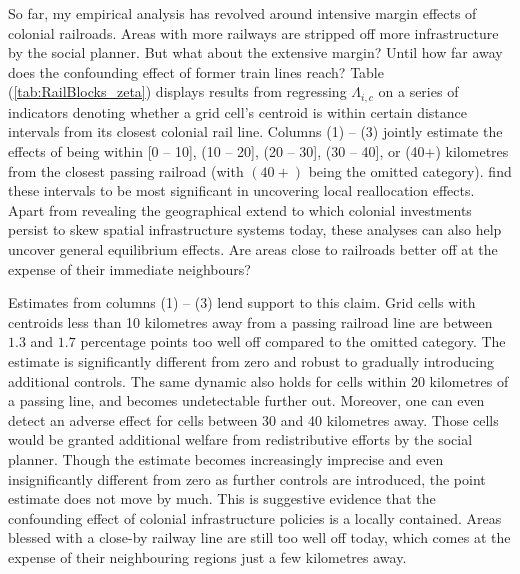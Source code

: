 \documentclass[11pt, oneside]{article}   	%
\let\oldref\ref
\renewcommand{\ref}[1]{(\oldref{#1})}
\begin{document}

So far, my empirical analysis has revolved around intensive margin effects of colonial railroads. Areas with more railways are stripped off more infrastructure by the social planner. But what about the extensive margin? Until how far away does the confounding effect of former train lines reach? Table \ref{tab:RailBlocks_zeta} displays results from regressing $\Lambda_{i,c}$ on a series of indicators denoting whether a grid cell's centroid is within certain distance intervals from its closest colonial rail line. Columns (1) -- (3) jointly estimate the effects of being within [0 -- 10], (10 -- 20], (20 -- 30], (30 -- 40], or (40+) kilometres from the closest passing railroad (with $(40+)$ being the omitted category). \cite{jedwab_permanent_2016} find these intervals to be most significant in uncovering local reallocation effects. Apart from revealing the geographical extend to which colonial investments persist to skew spatial infrastructure systems today, these analyses can also help uncover general equilibrium effects. Are areas close to railroads better off at the expense of their immediate neighbours?

Estimates from columns (1) -- (3) lend support to this claim. Grid cells with centroids less than 10 kilometres away from a passing railroad line are between $1.3$ and $1.7$ percentage points too well off compared to the omitted category. The estimate is significantly different from zero and robust to gradually introducing additional controls. The same dynamic also holds for cells within 20 kilometres of a passing line, and becomes undetectable further out. Moreover, one can even detect an adverse effect for cells between 30 and 40 kilometres away. Those cells would be granted additional welfare from redistributive efforts by the social planner. Though the estimate becomes increasingly imprecise and even insignificantly different from zero as further controls are introduced, the point estimate does not move by much. This is suggestive evidence that the confounding effect of colonial infrastructure policies is a locally contained. Areas blessed with a close-by railway line are still too well off today, which comes at the expense of their neighbouring regions just a few kilometres away.
\end{document}
